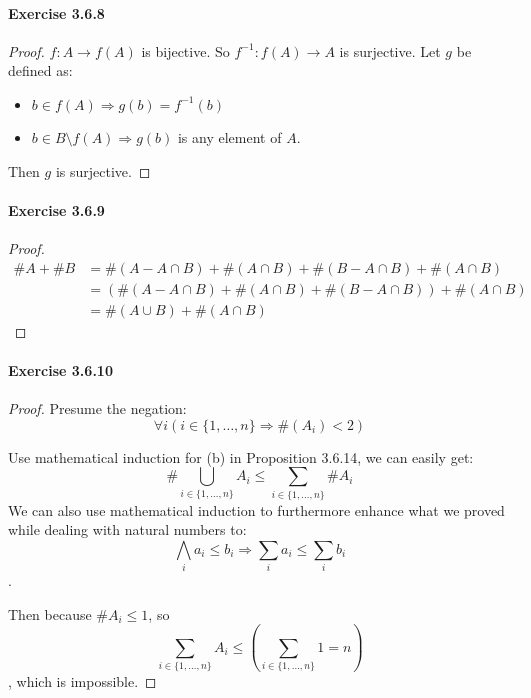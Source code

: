 \paragraph{Exercise 3.6.8} \label{exercise3.6.8}
\begin{proof}
$f:A \rightarrow f(A)$ is bijective. So $f^{-1}: f(A) \rightarrow A$ is surjective. Let $g$ be defined as:
\begin{itemize}
\item $b \in f(A) \Longrightarrow g(b) = f^{-1}(b)$
\item $b \in B\setminus f(A) \Longrightarrow g(b)$ is any element of $A$.
\end{itemize}

Then $g$ is surjective.
\end{proof}

\paragraph{Exercise 3.6.9} \label{exercise3.6.9}
\begin{proof}
\begin{align*}
\#A + \#B 
&= \#(A - A \cap B) + \#(A \cap B) + \#(B - A \cap B) + \#(A \cap B) \\
&= (\#(A - A \cap B) + \#(A \cap B) + \#(B - A \cap B)) + \#(A \cap B) \\
&= \#(A \cup B) + \#(A \cap B)
\end{align*}
\end{proof}

\paragraph{Exercise 3.6.10} \label{exercise3.6.10}
\begin{proof}
Presume the negation:
\[
\forall i(i \in \{1,\dots,n\} \Longrightarrow \#(A_i) < 2)
\]

Use mathematical induction for (b) in Proposition 3.6.14, we can easily get:
\[
\#\bigcup_{i \in \{1,\dots,n\}}A_i \leq \sum_{i \in \{1,\dots,n\}} \#A_i
\]
We can also use mathematical induction to furthermore enhance what we proved while dealing with natural 
numbers to:
\[
\bigwedge_{i} a_{i} \leq b_{i} \Longrightarrow \sum_{i} a_{i} \leq \sum_{i} b_i
\].

Then because $\# A_i \leq 1$, so 
\[
\sum_{i \in \{1,\dots,n\}} A_i \leq (\sum_{i \in \{1,\dots,n\}} 1 = n)
\], 
which is impossible.
\end{proof}